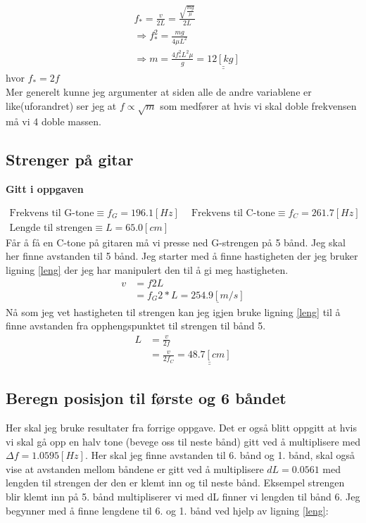 \documentclass[a4paper,12pt,norsk]{article}
\newcommand{\uu}{\underline}
\begin{document}
\begin{enumerate}[label = \alph*)]
\begin{align*}
& f_* = \frac{v}{2L} = \frac{\sqrt{\frac{mg}{\mu}}}{2L}\\
& \Rightarrow f_*^2 = \frac{mg}{4\mu L^2} \\
&\Rightarrow m = \frac{4f_*^2L^2\mu}{g} = \uu{\uu{12 [kg]}}
\end{align*}
hvor $f_* = 2f$\\

Mer generelt kunne jeg argumenter at siden alle de andre variablene er like(uforandret) ser jeg at $f \propto \sqrt{m}$ som medfører at hvis vi skal doble frekvensen må vi 4 doble massen.

\end{enumerate}

\subsection{Strenger på gitar}
\begin{center}
\textbf{Gitt i oppgaven}
\end{center}
\begin{align*}
\text{Frekvens til G-tone} \equiv f_G = 196.1[Hz] && \text{Frekvens til C-tone} \equiv f_C = 261.7[Hz] \\
\text{Lengde til strengen} \equiv L = 65.0 [cm]
\end{align*}
Får å få en C-tone på gitaren må vi presse ned G-strengen på 5 bånd. Jeg skal her finne avstanden til 5 bånd. Jeg starter med å finne hastigheten der jeg bruker ligning \ref{leng} der jeg har manipulert den til å gi meg hastigheten.
\begin{align*}
v &= f2L\\
&=f_G2*L = \uu{254.9[m/s]}
\end{align*}
Nå som jeg vet hastigheten til strengen kan jeg igjen bruke ligning \ref{leng} til å finne avstanden fra opphengspunktet til strengen til bånd 5.
\begin{align*}
L &= \frac{v}{2f}\\
&= \frac{v}{2f_C} = \uu{\uu{48.7[cm]}}
\end{align*}

\subsection{Beregn posisjon til første og 6 båndet}

Her skal jeg bruke resultater fra forrige oppgave. Det er også blitt oppgitt at hvis vi skal gå opp en halv tone (bevege oss til neste bånd) gitt ved å multiplisere med $\Delta f = 1.0595 [Hz]$. 
Her skal jeg finne avstanden til 6. bånd og 1. bånd, skal også vise at avstanden mellom båndene er gitt ved å multiplisere $dL = 0.0561$ med lengden til strengen der den er klemt inn og til neste bånd. Eksempel strengen blir klemt inn på 5. bånd multipliserer vi med dL finner vi lengden til bånd 6. 
Jeg begynner med å finne lengdene til 6. og 1. bånd ved hjelp av ligning \ref{leng}:
\end{document}
